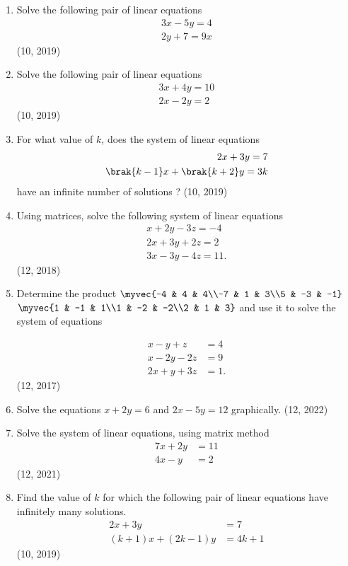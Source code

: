 \begin{enumerate}[label=\thesubsection.\arabic*,ref=\thesubsection.\theenumi]
\item Solve the following pair of linear equations 
\begin{align*}
 3x - 5y = 4\\
2y + 7 = 9x   
\end{align*}    
\hfill (10, 2019)

\item Solve the following pair of linear equations 
\begin{align*}
 3x + 4y = 10\\
2x - 2y = 2   
\end{align*}    
\hfill (10, 2019)
\item For what value of $k$, does the system of linear equations
\begin{align*}
   2x + 3y = 7\\
 \brak{k - 1} x + \brak{k + 2} y = 3k
\end{align*}
have an infinite number of solutions ?
\hfill (10, 2019)
\item Using matrices, solve the following system of linear equations 
	\begin{align*}
		x+2y-3z=-4\\
		2x+3y+2z=2\\
		3x-3y-4z=11.
	\end{align*}
\hfill (12, 2018)
\item Determine the product	$\myvec{-4 & 4 & 4\\-7 & 1 & 3\\5 & -3 & -1}$ $\myvec{1 & -1 &  1\\1 & -2 & -2\\2 &  1 &  3}$ and use it to solve the system of equations 

\begin{align*}
	x-y+z&=4\\
	x-2y-2z&=9
	\\
	2x+y+3z&=1 .
\end{align*}
\hfill (12, 2017)
\item Solve the equations $x+2y=6$ and $2x-5y=12$ graphically. \hfill (12, 2022)
\item Solve the system of linear equations, using matrix method  
\begin{align*}
  7x + 2y &= 11\\
  4x - y &= 2
\end{align*}
\hfill (12, 2021)
\item Find the value of $k$ for which the following pair of linear equations have infinitely many solutions. 
\begin{align*}
	2x+3y&=7
	\\
	(k+1)x+(2k-1)y&=4k+1
\end{align*}
\hfill (10, 2019)

\end{enumerate}
